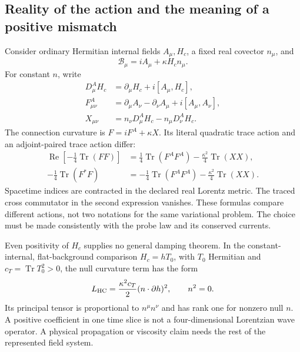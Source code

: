 \subsection{Reality of the action and the meaning of a positive mismatch}
Consider ordinary Hermitian internal fields $A_\mu,H_c$, a fixed real
covector $n_\mu$, and
\begin{equation}
 \mathcal B_\mu=iA_\mu+\kappa H_cn_\mu.
\end{equation}
For constant $n$, write
\begin{align}
 D_\mu^AH_c&=\partial_\mu H_c+i[A_\mu,H_c],\\
 F^A_{\mu\nu}&=\partial_\mu A_\nu-\partial_\nu A_\mu
                                      +i[A_\mu,A_\nu],\\
 X_{\mu\nu}&=n_\nu D_\mu^AH_c-n_\mu D_\nu^AH_c.
\end{align}
The connection curvature is $F=iF^A+\kappa X$. Its literal quadratic
trace action and an adjoint-paired trace action differ:
\begin{align}
 \operatorname{Re}\left[-\tfrac14\operatorname{Tr}(FF)\right]
 &=\tfrac14\operatorname{Tr}(F^AF^A)
          -\tfrac{\kappa^2}{4}\operatorname{Tr}(XX),\\
 -\tfrac14\operatorname{Tr}(F^*F)
 &=-\tfrac14\operatorname{Tr}(F^AF^A)
          -\tfrac{\kappa^2}{4}\operatorname{Tr}(XX).
\end{align}
Spacetime indices are contracted in the declared real Lorentz metric.
The traced cross commutator in the second expression vanishes.
These formulas compare different actions, not two notations for the
same variational problem. The choice must be made consistently with
the probe law and its conserved currents.

Even positivity of $H_c$ supplies no general damping theorem. In
the constant-internal, flat-background comparison $H_c=hT_0$, with
$T_0$ Hermitian and $c_T=\operatorname{Tr}T_0^2>0$, the null
curvature term has the form
\begin{equation}
 L_{\rm HC}=\frac{\kappa^2c_T}{2}(n\cdot\partial h)^2,
 \qquad n^2=0.
\end{equation}
Its principal tensor is proportional to $n^\mu n^\nu$ and has
rank one for nonzero null $n$. A positive coefficient in one time
slice is not a four-dimensional Lorentzian wave operator. A physical
propagation or viscosity claim needs the rest of the represented
field system.

